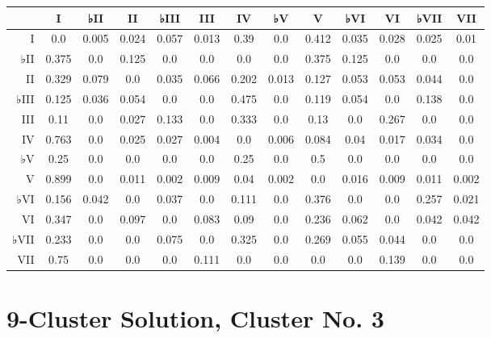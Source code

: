 \begin{table}[htbp]
\begin{minipage}{\linewidth}
\setlength{\tymax}{0.5\linewidth}
\centering
\small
\begin{tabulary}{\textwidth}{@{}RCCCCCCCCCCCC@{}} \toprule
&I&♭II&II&♭III&III&IV&♭V&V&♭VI&VI&♭VII&VII\\
\midrule
I&0.0&0.005&0.024&0.057&0.013&0.39&0.0&0.412&0.035&0.028&0.025&0.01\\
♭II&0.375&0.0&0.125&0.0&0.0&0.0&0.0&0.375&0.125&0.0&0.0&0.0\\
II&0.329&0.079&0.0&0.035&0.066&0.202&0.013&0.127&0.053&0.053&0.044&0.0\\
♭III&0.125&0.036&0.054&0.0&0.0&0.475&0.0&0.119&0.054&0.0&0.138&0.0\\
III&0.11&0.0&0.027&0.133&0.0&0.333&0.0&0.13&0.0&0.267&0.0&0.0\\
IV&0.763&0.0&0.025&0.027&0.004&0.0&0.006&0.084&0.04&0.017&0.034&0.0\\
♭V&0.25&0.0&0.0&0.0&0.0&0.25&0.0&0.5&0.0&0.0&0.0&0.0\\
V&0.899&0.0&0.011&0.002&0.009&0.04&0.002&0.0&0.016&0.009&0.011&0.002\\
♭VI&0.156&0.042&0.0&0.037&0.0&0.111&0.0&0.376&0.0&0.0&0.257&0.021\\
VI&0.347&0.0&0.097&0.0&0.083&0.09&0.0&0.236&0.062&0.0&0.042&0.042\\
♭VII&0.233&0.0&0.0&0.075&0.0&0.325&0.0&0.269&0.055&0.044&0.0&0.0\\
VII&0.75&0.0&0.0&0.0&0.111&0.0&0.0&0.0&0.0&0.139&0.0&0.0\\

\bottomrule

\end{tabulary}
\end{minipage}
\end{table}

\section{9-Cluster Solution, Cluster No. 3}
\label{9-clustersolutionclusterno.3}

